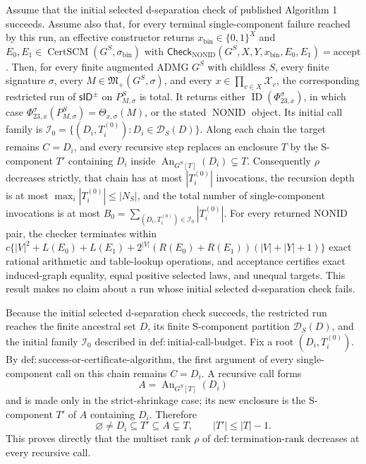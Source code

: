{%
Assume that the initial selected d-separation check of published Algorithm 1 succeeds.  Assume also that, for every terminal single-component failure reached by this run, an effective constructor returns \(x_{\mathrm{bin}}\in\{0,1\}^{X}\) and \(E_0,E_1\in\operatorname{CertSCM}(G^S,\sigma_{\mathrm{bin}})\) with \(\mathsf{Check}_{\mathrm{NONID}}(G^S,X,Y,x_{\mathrm{bin}},E_0,E_1)=\mathrm{accept}\).  Then, for every finite augmented ADMG \(G^S\) with childless \(S\), every finite signature \(\sigma\), every \(M\in\mathfrak M_+(G^S,\sigma)\), and every \(x\in\prod_{v\in X}\mathcal X_v\), the corresponding restricted run of \(\mathsf{sID}^{\pm}\) on \(P_{M,\sigma}^S\) is total.  It returns either \(\operatorname{ID}(\Phi_{23,x}^{\sigma})\), in which case \(\Phi_{23,x}^{\sigma}(P_{M,\sigma}^S)=\Theta_{x,\sigma}(M)\), or the stated \(\operatorname{NONID}\) object.  Its initial call family is \(\mathcal I_0=\{(D_i,T_i^{(0)}):D_i\in\mathcal D_S(D)\}\).  Along each chain the target remains \(C=D_i\), and every recursive step replaces an enclosure \(T\) by the S-component \(T'\) containing \(D_i\) inside \(\operatorname{An}_{G^S[T]}(D_i)\subsetneq T\).  Consequently \(\rho\) decreases strictly, that chain has at most \(|T_i^{(0)}|\) invocations, the recursion depth is at most \(\max_i|T_i^{(0)}|\le|N_S|\), and the total number of single-component invocations is at most \(B_0=\sum_{(D_i,T_i^{(0)})\in\mathcal I_0}|T_i^{(0)}|\).  For every returned NONID pair, the checker terminates within \(c\{|V|^2+L(E_0)+L(E_1)+2^{|V|}(R(E_0)+R(E_1))(|V|+|Y|+1)\}\) exact rational arithmetic and table-lookup operations, and acceptance certifies exact induced-graph equality, equal positive selected laws, and unequal targets.  This result makes no claim about a run whose initial selected d-separation check fails.

Because the initial selected d-separation check succeeds, the restricted run reaches the finite ancestral set \(D\), its finite S-component partition \(\mathcal D_S(D)\), and the initial family \(\mathcal I_0\) described in \(\mathrm{def:initial\text{-}call\text{-}budget}\).  Fix a root \((D_i,T_i^{(0)})\).  By \(\mathrm{def:success\text{-}or\text{-}certificate\text{-}algorithm}\), the first argument of every single-component call on this chain remains \(C=D_i\).  A recursive call forms
\[
 A=\operatorname{An}_{G^S[T]}(D_i)
\]
and is made only in the strict-shrinkage case; its new enclosure is the S-component \(T'\) of \(A\) containing \(D_i\).  Therefore
\[
 \varnothing\ne D_i\subseteq T'\subseteq A\subsetneq T,
 \qquad |T'|\le |T|-1.
\]
This proves directly that the multiset rank \(\rho\) of \(\mathrm{def:termination\text{-}rank}\) decreases at every recursive call.

}
